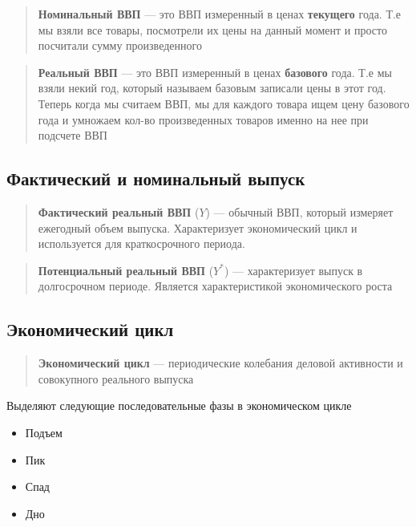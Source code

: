 \documentclass{article}
\begin{document}
    \begin{quote}
        \textbf{Номинальный ВВП} --- это ВВП измеренный в ценах \textbf{текущего} года. Т.е мы взяли все товары,
        посмотрели их цены на данный момент и просто посчитали сумму произведенного
    \end{quote}

    \begin{quote}
        \textbf{Реальный ВВП} --- это ВВП измеренный в ценах \textbf{базового} года.
        Т.е мы взяли некий год, который называем базовым записали цены в этот год.
        Теперь когда мы считаем ВВП, мы для каждого товара ищем цену базового года
        и умножаем кол-во произведенных товаров именно на нее при подсчете ВВП
    \end{quote}


    \subsection{Фактический и номинальный выпуск}

    \begin{quote}
        \textbf{Фактический реальный ВВП} ($Y$) --- обычный ВВП, который измеряет ежегодный объем выпуска.
        Характеризует экономический цикл и используется для краткосрочного периода.
    \end{quote}

    \begin{quote}
        \textbf{Потенциальный реальный ВВП} ($Y^{*}$) --- характеризует выпуск в долгосрочном периоде.
        Является характеристикой экономического роста
    \end{quote}

    \subsection{Экономический цикл}


    \begin{quote}
        \textbf{Экономический цикл} --- периодические колебания деловой активности и совокупного реального выпуска
    \end{quote}

    Выделяют следующие последовательные фазы в экономическом цикле

    \begin{itemize}
        \item Подъем
        \item Пик
        \item Спад
        \item Дно
    \end{itemize}
\end{document}
